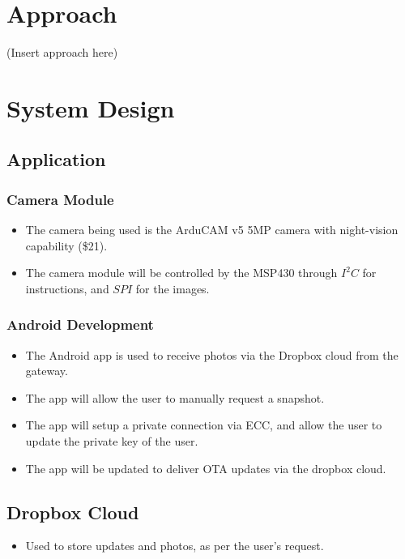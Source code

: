 \documentclass[11pt]{article}
\begin{document}
\section{Approach}

(Insert approach here)



\section{System Design}
\subsection{Application} 

\subsubsection{Camera Module}

\begin{itemize}
\item The camera being used is the ArduCAM v5 5MP camera with night-vision capability (\$21).
\item The camera module will be controlled by the MSP430 through $I^2C$ for instructions, and $SPI$  for the images.
\end{itemize}

\subsubsection{Android Development}

\begin{itemize}
\item The Android app is used to receive photos via the Dropbox cloud from the gateway.
\item The app will allow the user to manually request a snapshot.
\item The app will setup a private connection via ECC, and allow the user to update the private key of the user. 
\item The app will be updated to deliver OTA updates via the dropbox cloud.
\end{itemize}

\subsection{Dropbox Cloud}
\begin{itemize}
\item Used to store updates and photos, as per the user's request.
\end{itemize}
\end{document}
